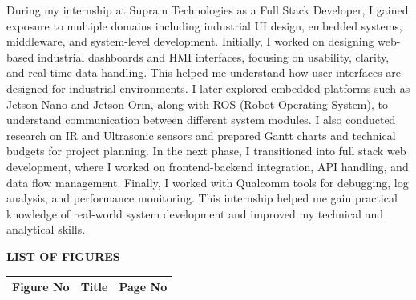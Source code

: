\documentclass[12pt,a4paper]{report}
\newif\ifshowborder
\begin{document}
During my internship at Supram Technologies as a Full Stack Developer, I gained exposure to multiple domains including industrial UI design, embedded systems, middleware, and system-level development. Initially, I worked on designing web-based industrial dashboards and HMI interfaces, focusing on usability, clarity, and real-time data handling. This helped me understand how user interfaces are designed for industrial environments. I later explored embedded platforms such as Jetson Nano and Jetson Orin, along with ROS (Robot Operating System), to understand communication between different system modules. I also conducted research on IR and Ultrasonic sensors and prepared Gantt charts and technical budgets for project planning. In the next phase, I transitioned into full stack web development, where I worked on frontend-backend integration, API handling, and data flow management. Finally, I worked with Qualcomm tools for debugging, log analysis, and performance monitoring. This internship helped me gain practical knowledge of real-world system development and improved my technical and analytical skills.


\newpage
\tableofcontents

\newpage
\begin{center}
{\Large \textbf{LIST OF FIGURES}\par}
\end{center}

\vspace{0.3cm}
\begin{tabular}{@{} p{2cm} p{10cm} r @{}}
\textbf{Figure No} & \textbf{Title} & \textbf{Page No} \\
\midrule
\end{tabular}

\newpage
\showborderfalse       %
\end{document}

